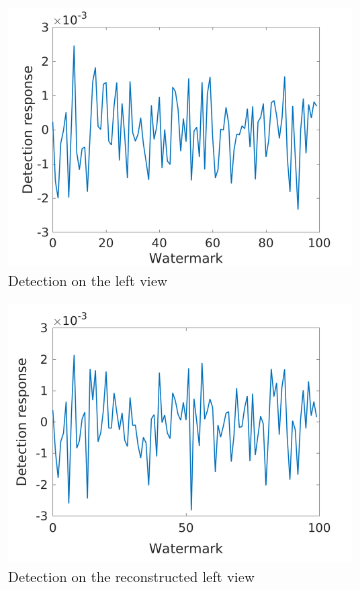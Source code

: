 \begin{figure}[h!]
\centering
\begin{subfigure}[t]{0.5\textwidth}
\centering
\includegraphics[width=1\textwidth]{./img/corr_gauss/left_corr_value_NM.png}
  \caption{\small{Detection on the left view}\label{fig:gl}}
\end{subfigure}%
\begin{subfigure}[t]{0.5\textwidth}
\centering
\includegraphics[width=1\textwidth]{./img/corr_gauss/right_warpedwat_corr_value_NM.png}
\caption{\small{Detection on the reconstructed left view}\label{fig:grw}}
\end{subfigure}
\begin{subfigure}[t]{0.5\textwidth}
\centering

\end{subfigure}
\end{figure}
